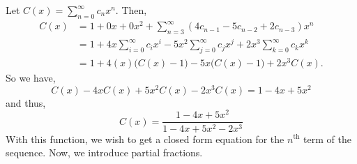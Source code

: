 \documentclass[11pt]{article}
\begin{document}
\begin{titlepage}
Let $C(x) = \sum^\infty_{n=0}c_nx^n$.
Then,
\begin{align*}
	C(x) &= 1 + 0x +0x^2 + \sum^\infty_{n=3}(4c_{n-1} -5c_{n-2}+ 2c_{n-3})x^n\\
		 &= 1 + 4x \sum^\infty_{i=0}c_ix^i - 5x^2\sum^\infty_{j=0}c_jx^j +
	2x^3\sum^\infty_{k=0}c_kx^k\\
	&= 1 + 4(x)\big(C(x) - 1\big) - 5x\big(C(x) - 1\big) + 2x^3C(x).
\end{align*}
So we have,
\begin{equation*}
	C(x) - 4xC(x) + 5x^2C(x) -2x^3C(x) = 1-4x+5x^2
\end{equation*}
and thus,
\begin{equation}\label{eq1}
	C(x) = \frac{1-4x+5x^2}{1-4x+5x^2-2x^3}
\end{equation}
With this function, we wish to get a closed form equation for the
$n^{\text{th}}$ term of the sequence. Now, we introduce partial fractions.


\end{titlepage}
\end{document}
